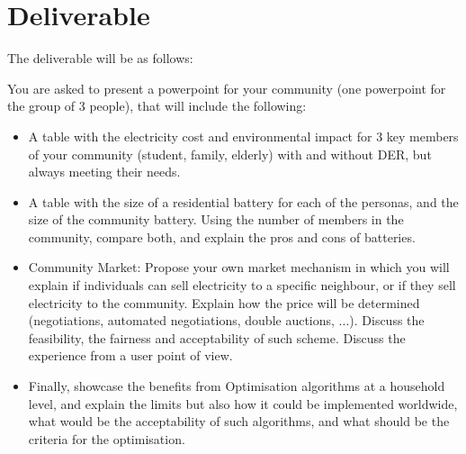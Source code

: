 \documentclass[a4paper, chapterprefix=true, openany]{scrbook}
\begin{document}
\chapter{Deliverable}
The deliverable will be as follows:

You are asked to present a powerpoint for your community (one powerpoint for the group of 3 people), that will include the following:
\begin{itemize}
	\item A table with the electricity cost and environmental impact for 3 key members of your community (student, family, elderly) with and without DER, but always meeting their needs.
	\item A table with the size of a residential battery for each of the personas, and the size of the community battery. Using the number of members in the community, compare both, and explain the pros and cons of batteries.
	\item Community Market: Propose your own market mechanism in which you will explain if individuals can sell electricity to a specific neighbour, or if they sell electricity to the community. Explain how the price will be determined (negotiations, automated negotiations, double auctions, ...). Discuss the feasibility, the fairness and acceptability of such scheme. Discuss the experience from a user point of view.
	\item Finally, showcase the benefits from Optimisation algorithms at a household level, and explain the limits but also how it could be implemented worldwide, what would be the acceptability of such algorithms, and what should be the criteria for the optimisation.
\end{itemize}
	
	
	\clearpage
%	
%	
	
	
\end{document}
